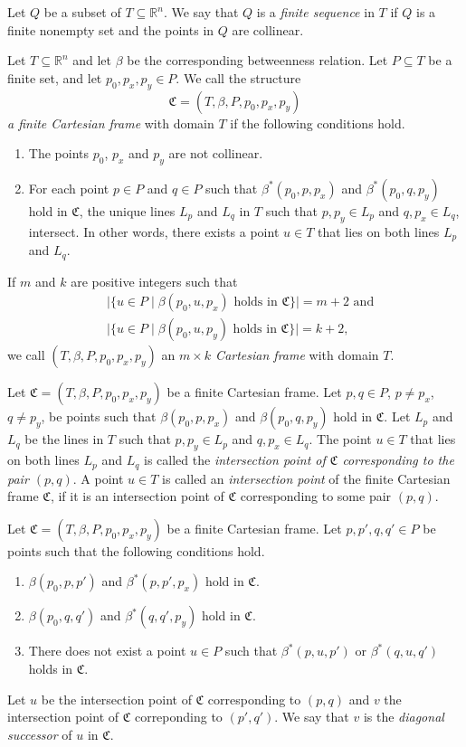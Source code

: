 \documentclass{LMCS}
\theoremstyle{plain}
\newcommand{\rsq}{\mathbb{R}^n}
\newcommand{\mf}{\mathfrak}
\begin{document}
%
Let $Q$ be a subset of $T\subseteq\rsq$. We say that $Q$ is a \emph{finite sequence} in $T$ if $Q$ is a finite
%
nonempty set and the points in $Q$ are collinear.

\begin{defi}
Let $T\subseteq\rsq$ and let $\beta$ be the corresponding betweenness relation.
%
Let $P\subseteq T$ be a finite set, and let $p_0,p_x,p_y\in P$. We call the structure
\[
\mf{C}=(T,\beta,P,p_0,p_x,p_y)
\]
\emph{a finite Cartesian frame} with domain $T$ if the following conditions hold.
%
\begin{enumerate}
\item The points $p_0$, $p_x$ and $p_y$ are not collinear.
%
\item For each point $p\in P$ and $q\in P$ such that $\beta^*(p_0,p,p_x)$
and $\beta^*(p_0,q,p_y)$ hold in $\mf{C}$, the unique lines $L_p$ and $L_q$ in $T$ such that $p,p_y\in L_p$ and $q,p_x\in L_q$, intersect. In other words, there exists a point $u\in T$ that lies on both lines $L_p$ and $L_q$.
%
\end{enumerate}
%
%
%
If $m$ and $k$ are positive integers such that 
%
%
%
\begin{align*}
%
&\lvert \{u\in P\mid \beta(p_0,u,p_x) \text{ holds in }\mf{C}\}\rvert=m+2\text{ and}\\
%
&\lvert \{u\in P\mid \beta(p_0,u,p_y) \text{ holds in }\mf{C}\}\rvert=k+2,
%
%
%
\end{align*}
%
%
%
we call $(T,\beta,P,p_0,p_x,p_y)$ an \emph{$m\times k$ Cartesian frame} with domain $T$.
%
\end{defi}
%
%
\begin{defi}
%
Let $\mf{C}=(T,\beta,P,p_0,p_x,p_y)$ be a finite Cartesian frame. 
%
Let $p,q\in P$, $p\neq p_x$, $q\neq p_y$, be points such that $\beta(p_0,p,p_x)$ and $\beta(p_0,q,p_y)$ hold in $\mf{C}$.
%
Let $L_p$ and $L_q$ be the lines in $T$ such that $p,p_y\in L_p$ and $q,p_x\in L_q$.
%
The point $u\in T$ that lies on both lines $L_p$ and $L_q$ is called the
%
\emph{intersection point of $\mf{C}$ corresponding to the pair $(p,q)$}. A point $u\in T$ is called an \emph{intersection point} of the finite Cartesian
%
frame $\mf{C}$, if it is an intersection point of $\mf{C}$
%
corresponding to some pair $(p,q)$.
%
\end{defi}
%
%
%
%
\begin{defi}
%
Let $\mf{C}=(T,\beta,P,p_0,p_x,p_y)$ be a finite Cartesian frame.
%
%
Let $p,p',q,q'\in P$ be points such that the following conditions hold.
\begin{enumerate}
\item $\beta(p_0,p,p')$ and $\beta^*(p,p',p_x)$ hold in $\mf{C}$.
\item $\beta(p_0,q,q')$ and $\beta^*(q,q',p_y)$ hold in $\mf{C}$.
\item There does not exist a point $u\in P$ such that $\beta^*(p,u,p')$ or $\beta^*(q,u,q')$ holds in $\mf{C}$.
\end{enumerate}
%
%
Let $u$ be the intersection point of $\mf{C}$ corresponding to $(p,q)$ and $v$ the
%
intersection point of $\mf{C}$ correponding to $(p',q')$.
%
We say that $v$ is the \emph{diagonal successor} of $u$ in $\mf{C}$.
%
\end{defi}
\end{document}
